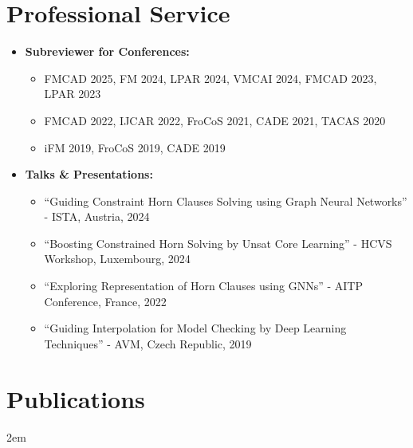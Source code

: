 \documentclass{clean_cv}
\begin{document}
\section{Professional Service}
\begin{itemize}
\item \textbf{Subreviewer for Conferences:}
\begin{itemize}
\item FMCAD 2025, FM 2024, LPAR 2024, VMCAI 2024, FMCAD 2023, LPAR 2023
\item FMCAD 2022, IJCAR 2022, FroCoS 2021, CADE 2021, TACAS 2020
\item iFM 2019, FroCoS 2019, CADE 2019
\end{itemize}
\item \textbf{Talks \& Presentations:}
\begin{itemize}
\item ``Guiding Constraint Horn Clauses Solving using Graph Neural Networks'' - ISTA, Austria, 2024
\item ``Boosting Constrained Horn Solving by Unsat Core Learning'' - HCVS Workshop, Luxembourg, 2024
\item ``Exploring Representation of Horn Clauses using GNNs'' - AITP Conference, France, 2022
\item ``Guiding Interpolation for Model Checking by Deep Learning Techniques'' - AVM, Czech Republic, 2019
\end{itemize}
\end{itemize}

\section{Publications}
\nocite{*} %
\begin{datetabular}{2em}
\end{datetabular}
\end{document}
